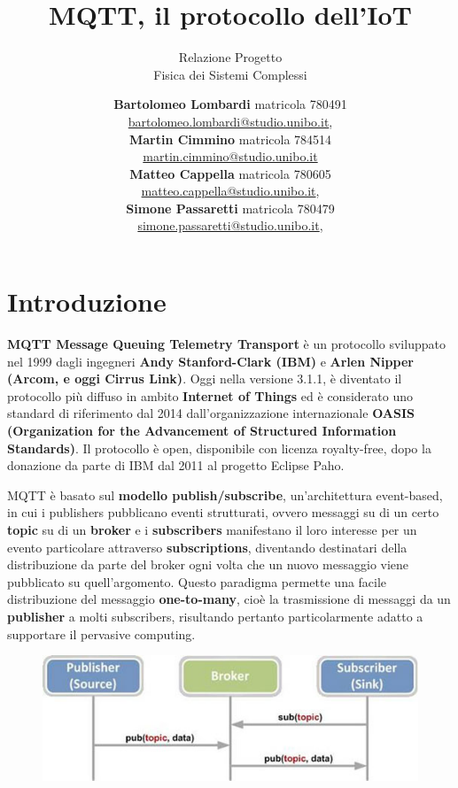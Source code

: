 \documentclass[]{scrartcl}
\title{MQTT, il protocollo dell'IoT}
\subtitle{Relazione Progetto \\
		Fisica dei Sistemi Complessi}
\author{
		\textbf{Bartolomeo Lombardi} matricola 780491\\
		 \href{mailto:bartolomeo.lombardi@studio.unibo.it}{bartolomeo.lombardi@studio.unibo.it},\\
		 \textbf{Martin Cimmino} matricola 784514\\
	    \href{mailto:martin.cimmino@studio.unibo.it}{martin.cimmino@studio.unibo.it}\\
	 	\textbf{Matteo Cappella} matricola 780605\\
	 	 \href{mailto:matteo.cappella@studio.unibo.it}{matteo.cappella@studio.unibo.it},\\
		\textbf{Simone Passaretti} matricola 780479\\
		\href{mailto:simone.passaretti@studio.unibo.it}{simone.passaretti@studio.unibo.it},\\
}
\begin{document}
\maketitle
\vspace{60pt} %

\section{Introduzione}

\textbf{MQTT  Message Queuing Telemetry Transport} è un protocollo sviluppato nel 1999 dagli ingegneri \textbf{Andy Stanford-Clark (IBM)} e \textbf{Arlen Nipper (Arcom, e oggi Cirrus Link)}. Oggi nella versione  3.1.1, è diventato il protocollo più diffuso in ambito \textbf{Internet of Things} ed è considerato uno standard di riferimento dal 2014 dall'organizzazione internazionale \textbf{OASIS (Organization for the Advancement of Structured Information Standards)}. Il protocollo è open, disponibile con licenza royalty-free, dopo la donazione da parte di IBM dal 2011 al progetto Eclipse Paho.

MQTT è basato sul \textbf{modello publish/subscribe}, un’architettura event-based, in cui i publishers pubblicano eventi strutturati, ovvero messaggi su di un certo \textbf{topic} su di un \textbf{broker} e i \textbf{subscribers} manifestano il loro interesse per un evento particolare attraverso \textbf{subscriptions}, diventando destinatari della distribuzione da parte del broker ogni volta che un nuovo messaggio viene pubblicato su quell’argomento. Questo paradigma permette una facile distribuzione del messaggio \textbf{one-to-many}, cioè la trasmissione di messaggi da un \textbf{publisher} a molti subscribers, risultando pertanto particolarmente adatto a supportare il pervasive computing.

\begin{figure}[h]
	\centering
	\includegraphics[scale=0.8]{publish_subscribe.jpg}
\end{figure}
\end{document}
